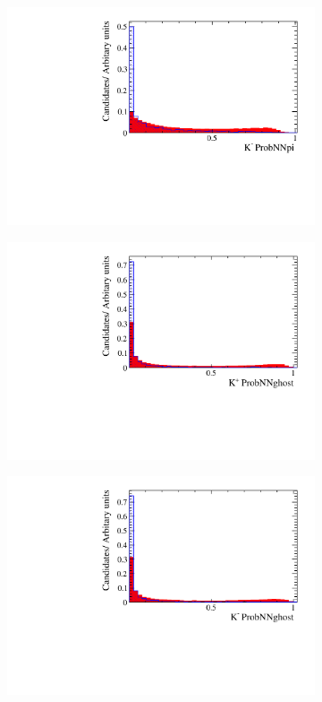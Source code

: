 \begin{figure}[!h]
\begin{subfigure}[t]{0.22\textwidth}
      \includegraphics[width=1.0\textwidth]{figs/Selection/Phi_BDT_Var_Ds2KKPi_Phi_K1_MC15TuneV1_ProbNNpi.pdf}
   \end{subfigure}
   \begin{subfigure}[t]{0.22\textwidth}
      \centering
      \includegraphics[width=1.0\textwidth]{figs/Selection/Phi_BDT_Var_Ds2KKPi_Phi_K0_MC15TuneV1_ProbNNghost.pdf}
   \end{subfigure}
   \begin{subfigure}[t]{0.22\textwidth}
      \centering
      \includegraphics[width=1.0\textwidth]{figs/Selection/Phi_BDT_Var_Ds2KKPi_Phi_K1_MC15TuneV1_ProbNNghost.pdf}

\end{subfigure}
\end{figure}
